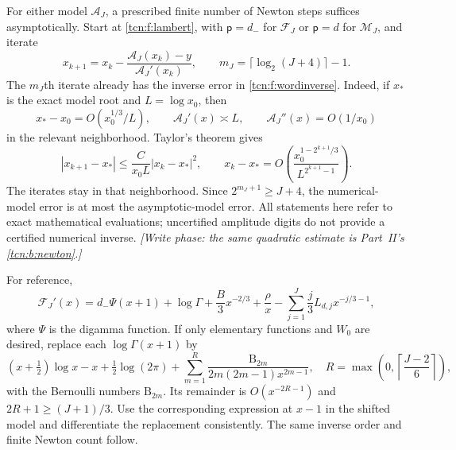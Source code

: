 \documentclass[11pt,letterpaper]{article}
\theoremstyle{remark}
\begin{document}
For either model $\mathcal A_J$, a prescribed finite number of Newton steps suffices asymptotically. Start at \eqref{tcn:f:lambert}, with $\mathsf p=d_-$ for $\mathcal F_J$ or $\mathsf p=d$ for $\mathcal M_J$, and iterate
\begin{equation}\label{tcn:f:newton}
 x_{k+1}=x_k-\frac{\mathcal A_J(x_k)-y}{\mathcal A_J'(x_k)},\qquad
 m_J=\lceil\log_2(J+4)\rceil-1.
\end{equation}
The $m_J$th iterate already has the inverse error in \eqref{tcn:f:wordinverse}. Indeed, if $x_*$ is the exact model root and $L=\log x_0$, then
\[
 x_*-x_0=O(x_0^{1/3}/L),\qquad
 \mathcal A_J'(x)\asymp L,\qquad
 \mathcal A_J''(x)=O(1/x_0)
\]
in the relevant neighborhood. Taylor's theorem gives
\[
 |x_{k+1}-x_*|\le\frac{C}{x_0L}|x_k-x_*|^2,
 \qquad
 x_k-x_*=O\left(\frac{x_0^{1-2^{k+1}/3}}{L^{2^{k+1}-1}}\right).
\]
The iterates stay in that neighborhood. Since $2^{m_J+1}\ge J+4$, the numerical-model error is at most the asymptotic-model error. All statements here refer to exact mathematical evaluations; uncertified amplitude digits do not provide a certified numerical inverse. \emph{[Write phase: the same quadratic estimate is Part~II's \eqref{tcn:b:newton}.]}

For reference,
\[
 \mathcal F_J'(x)=d_-\Psi(x+1)+\log\Gamma+\frac B3x^{-2/3}
 +\frac\rho x-\sum_{j=1}^J\frac j3L_{d,j}x^{-j/3-1},
\]
where $\Psi$ is the digamma function. If only elementary functions and $W_0$ are desired, replace each $\log\Gamma(x+1)$ by
\begin{equation}\label{tcn:f:stirlinginverse}
 (x+\tfrac12)\log x-x+\tfrac12\log(2\pi)
 +\sum_{m=1}^R\frac{\mathrm B_{2m}}{2m(2m-1)x^{2m-1}},\quad
 R=\max\left(0,\left\lceil\frac{J-2}{6}\right\rceil\right),
\end{equation}
with the Bernoulli numbers $\mathrm B_{2m}$. Its remainder is $O(x^{-2R-1})$ and $2R+1\ge(J+1)/3$. Use the corresponding expression at $x-1$ in the shifted model and differentiate the replacement consistently. The same inverse order and finite Newton count follow.
\end{document}
